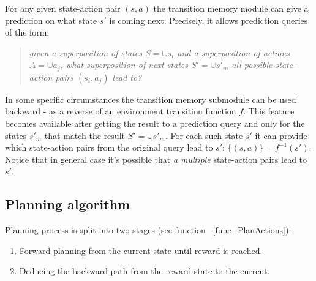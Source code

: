\documentclass[runningheads]{llncs}
\begin{document}
For any given state-action pair $(s, a)$ the transition memory module can give a prediction on what state $s'$ is coming next.
Precisely, it allows prediction queries of the form:

\begin{quote}
  \textit{given a superposition \footnotemark of states $S = \cup s_i$ and a superposition of actions $A = \cup a_j$, what superposition of next states $S'= \cup s'_m$ all possible state-action pairs $(s_i, a_j)$ lead to?}
\end{quote}



In some specific circumstances the transition memory submodule can be used backward - as a reverse of an environment transition function $f$. This feature becomes available after getting the result to a prediction query and only for the states $s'_m$ that match the result $S' = \cup s'_m$. For each such state $s'$ it can provide which state-action pairs from the original query lead to $s'$: $\{(s, a)\} = f^{-1}(s')$. Notice that in general case it's possible that \textit{a multiple} state-action pairs lead to $s'$.

\subsection{Planning algorithm}

Planning process is split into two stages (see function ~\ref{func_PlanActions}):

\begin{enumerate}
  \item Forward planning from the current state until reward is reached.
  \item Deducing the backward path from the reward state to the current.
\end{enumerate}
\end{document}
